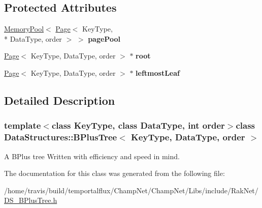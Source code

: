 \subsection*{Protected Attributes}
\begin{DoxyCompactItemize}
\item 
\hypertarget{class_data_structures_1_1_b_plus_tree_a204cdd55060f14a2e5dbbaa4768859df}{\hyperlink{class_data_structures_1_1_memory_pool}{Memory\-Pool}$<$ \hyperlink{struct_data_structures_1_1_page}{Page}$<$ Key\-Type, \\*
Data\-Type, order $>$ $>$ {\bfseries page\-Pool}}\label{class_data_structures_1_1_b_plus_tree_a204cdd55060f14a2e5dbbaa4768859df}

\item 
\hypertarget{class_data_structures_1_1_b_plus_tree_a6a2002e71af1cfd4abc759c63bfc768e}{\hyperlink{struct_data_structures_1_1_page}{Page}$<$ Key\-Type, Data\-Type, order $>$ $\ast$ {\bfseries root}}\label{class_data_structures_1_1_b_plus_tree_a6a2002e71af1cfd4abc759c63bfc768e}

\item 
\hypertarget{class_data_structures_1_1_b_plus_tree_aa6bbdd2d1c1df48f7b41d71c2f035d03}{\hyperlink{struct_data_structures_1_1_page}{Page}$<$ Key\-Type, Data\-Type, order $>$ $\ast$ {\bfseries leftmost\-Leaf}}\label{class_data_structures_1_1_b_plus_tree_aa6bbdd2d1c1df48f7b41d71c2f035d03}

\end{DoxyCompactItemize}


\subsection{Detailed Description}
\subsubsection*{template$<$class Key\-Type, class Data\-Type, int order$>$class Data\-Structures\-::\-B\-Plus\-Tree$<$ Key\-Type, Data\-Type, order $>$}

A B\-Plus tree Written with efficiency and speed in mind. 

The documentation for this class was generated from the following file\-:\begin{DoxyCompactItemize}
\item 
/home/travis/build/temportalflux/\-Champ\-Net/\-Champ\-Net/\-Libs/include/\-Rak\-Net/\hyperlink{_d_s___b_plus_tree_8h}{D\-S\-\_\-\-B\-Plus\-Tree.\-h}\end{DoxyCompactItemize}
